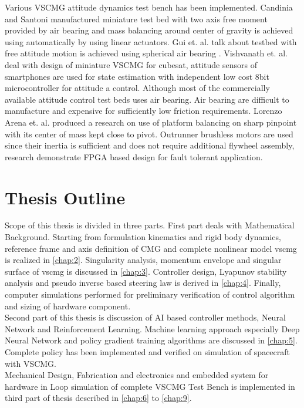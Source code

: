 \noindent%
Various VSCMG attitude dynamics test bench has been implemented.  Candinia and Santoni manufactured miniature test bed with two axis free moment provided by air bearing and mass balancing around center of gravity is achieved using automatically by using linear actuators. \cite{Candinia2012} Gui et. al. talk about testbed with free attitude motion is achieved using spherical air bearing \cite{Gui2015}. Vishvanath et. al. deal with design of miniature VSCMG for cubesat, attitude sensors of smartphones are used for state estimation with independent low cost 8bit microcontroller for attitude a control.\cite{2015arXiv150903677P}  Although most of the commercially available attitude control test beds uses air bearing. Air bearing are difficult to manufacture and expensive for sufficiently low friction requirements.
Lorenzo Arena et. al. produced a research on use of platform balancing on sharp pinpoint with its center of mass kept close to pivot. Outrunner brushless motors are used since their inertia is sufficient and does not require additional flywheel assembly, research demonstrate FPGA based design for fault tolerant application. \cite{doi:10.1061/(ASCE)AS.1943-5525.0000754}




\section{Thesis Outline}
Scope of this thesis is divided in three parts. First part deals with Mathematical Background. Starting from formulation kinematics and rigid body dynamics, reference frame and axis definition of CMG and complete nonlinear model \acrshort{vscmg} is realized in \autoref{chap:2}. Singularity analysis, momentum envelope and singular surface of \acrshort{vscmg} is discussed in \autoref{chap:3}. Controller design, Lyapunov stability analysis and pseudo inverse based steering law is derived in \autoref{chap:4}. Finally, computer simulations performed for preliminary verification of control algorithm and sizing of hardware component.\\


\noindent Second part of this thesis is discussion of AI based controller methods, Neural Network and Reinforcement Learning. Machine learning approach especially Deep Neural Network and policy gradient training algorithms are discussed in \autoref{chap:5}. Complete policy has been implemented and verified on simulation of spacecraft with VSCMG.\\


\noindent Mechanical Design, Fabrication and electronics and embedded system for hardware in Loop simulation of complete VSCMG Test Bench is implemented in third part of thesis described in \autoref{chap:6} to \autoref{chap:9}.
